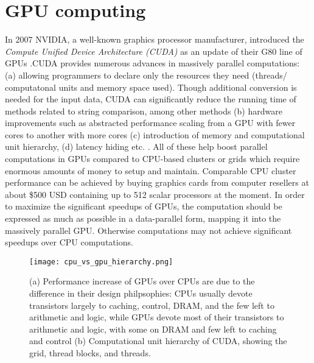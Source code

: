 \documentclass{llncs}
\begin{document}
{\section{GPU computing}

In 2007 NVIDIA, a well-known graphics processor manufacturer, introduced the \textit{Compute Unified Device Architecture (CUDA)} as an update of their G80 line of GPUs \cite{cudabook}.CUDA provides numerous advances in massively parallel computations: (a) allowing programmers to declare only the resources they need (threads/ computatonal units and memory space used). Though additional conversion is needed for the input data, CUDA can significantly reduce the running time of methods related to string comparison, among other methods (b) hardware improvements such as abstracted performance scaling from a GPU with fewer cores to another with more cores (c) introduction of memory and computational unit hierarchy, (d) latency hiding etc. \cite{cudaguide,cudabook}. All of these help boost parallel computations in GPUs compared to CPU-based clusters or grids which require enormous amounts of money to setup and maintain. Comparable CPU cluster performance can be achieved by buying graphics cards from computer resellers at about \$500 USD containing up to 512 scalar processors at the moment. In order to maximize the significant speedups of GPUs, the computation should be expressed as much as possible in a data-parallel form, mapping it into the massively parallel GPU. Otherwise computations may not achieve significant speedups over CPU computations.
\begin{figure}[h]
\begin{small}
\centering
\texttt{[image: cpu\_vs\_gpu\_hierarchy.png]}
\caption{(a) Performance increase of GPUs over CPUs are due to the difference in their design philpsophies: CPUs usually devote transistors largely to caching, control, DRAM, and the few left to arithmetic and logic, while GPUs devote most of their transistors to arithmetic and logic, with some on DRAM and few left to caching and control \cite{cudabook,gpgpu} (b) Computational unit hierarchy of CUDA, showing the grid, thread blocks, and threads. } 
\label{gpu-vs-cpu}
\end{small}
\end{figure}

}
\end{document}
